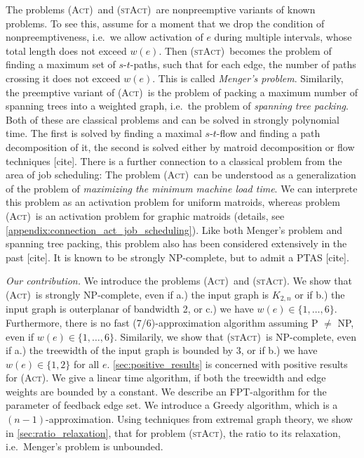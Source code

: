 \documentclass[runningheads]{llncs}
\numberwithin{equation}{section}
\newcommand{\set}[1]{\{ #1 \}}
\newcommand{\fromto}[2]{\set{#1, \ldots, #2}}
\newcommand{\act}{\textsc{(Act)}}
\newcommand{\stact}{\textsc{(stAct)}}
\begin{document}
The problems \act\ and \stact\ are nonpreemptive variants of known problems. To see this, assume for a moment that we drop the condition of nonpreemptiveness, i.e.\ we allow activation of $e$ during multiple intervals, whose total length does not exceed $w(e)$. Then \stact\ becomes the problem of finding a maximum set of $s$-$t$-paths, such that for each edge, the number of paths crossing it does not exceed $w(e)$. This is called \emph{Menger's problem}. Similarily, the preemptive variant of \act\ is the problem of packing a maximum number of spanning trees into a weighted graph, i.e.\ the problem of \emph{spanning tree packing}. Both of these are classical problems and can be solved in strongly polynomial time. The first is solved by finding a maximal $s$-$t$-flow and finding a path decomposition of it, the second is solved either by matroid decomposition or flow techniques [cite]. There is a further connection to a classical problem from the area of job scheduling: The problem \act\ can be understood as a generalization of the problem of \emph{maximizing the minimum machine load time}. We can interprete this problem as an activation problem for uniform matroids, whereas problem \act\ is an activation problem for graphic matroids (details, see \cref{appendix:connection_act_job_scheduling}). Like both Menger's problem and spanning tree packing, this problem also has been considered extensively in the past [cite]. It is known to be strongly NP-complete, but to admit a PTAS [cite].

\emph{Our contribution.}
We introduce the problems \act\ and \stact. We show that \act\ is strongly NP-complete, even if a.) the input graph is $K_{2,n}$ or if b.) the input graph is outerplanar of bandwidth 2, or c.) we have $w(e) \in \fromto{1}{6}$. Furthermore, there is no fast (7/6)-approximation algorithm assuming P $\neq$ NP, even if $w(e) \in \fromto{1}{6}$. Similarily, we show that \stact\ is NP-complete, even if a.) the treewidth of the input graph is bounded by 3, or if b.) we have $w(e) \in \set{1,2}$ for all $e$. 
\cref{sec:positive_results} is concerned with positive results for \act. We give a linear time algorithm, if both the treewidth and edge weights are bounded by a constant. We describe an FPT-algorithm for the parameter of feedback edge set. We introduce a Greedy algorithm, which is a $(n-1)$-approximation. Using techniques from extremal graph theory, we show in \cref{sec:ratio_relaxation}, that for problem \stact, the ratio to its relaxation, i.e.\ Menger's problem is unbounded.
\end{document}
